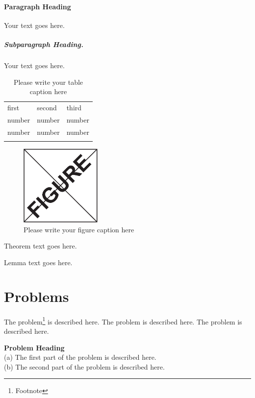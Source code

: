 \paragraph{Paragraph Heading} %
Your text goes here.

\subparagraph{Subparagraph Heading.} Your text goes here.%
%
%
%
\begin{table}
\centering
\caption{Please write your table caption here}
\label{tab:1}       %
%
%
\begin{tabular}{lll}
\hline\noalign{\smallskip}
first & second & third  \\
\noalign{\smallskip}\hline\noalign{\smallskip}
number & number & number \\
number & number & number \\
\noalign{\smallskip}\hline
\end{tabular}
\end{table}
%
%
%
\begin{figure}
\centering
\includegraphics[height=4cm]{figure}
%
%
\caption{Please write your figure caption here}
\label{fig:1}       %
\end{figure}
%
%
\begin{theorem}
Theorem text goes here.
\end{theorem}
%
%
\begin{lemma}
Lemma text goes here.
\end{lemma}
%
%
\section*{Problems}
%
\begin{prob}
\label{prob1}
The problem\footnote{Footnote} is described here. The
problem is described here. The problem is described here.
\end{prob}

\begin{prob}
\label{prob2}
\textbf{Problem Heading}\\
(a) The first part of the problem is described here.\\
(b) The second part of the problem is described here.
\end{prob}



%
